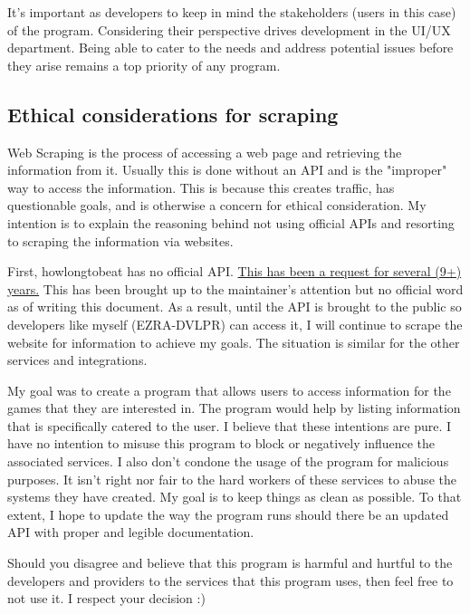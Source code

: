 It's important as developers to keep in mind the stakeholders (users
in this case) of the program. Considering their perspective drives
development in the UI/UX department. Being able to cater to the needs
and address potential issues before they arise remains a top priority
of any program.

\subsection{Ethical considerations for scraping}

Web Scraping is the process of accessing a web page and retrieving
the information from it. Usually this is done without an API and is
the "improper" way to access the information. This is because this
creates traffic, has questionable goals, and is otherwise a concern
for ethical consideration. My intention is to explain the reasoning
behind not using official APIs and resorting to scraping the
information via websites.

First, howlongtobeat has no official API.
\href{https://howlongtobeat.com/forum/thread/807/1}{This has been a
request for several (9+) years.} This has been brought up to the
maintainer's attention but no official word as of writing this
document. As a result, until the API is brought to the public so
developers like myself (EZRA-DVLPR) can access it, I will continue to scrape
the website for information to achieve my goals.
The situation is similar for the other services and integrations.

My goal was to create a program that allows users to access
information for the games that they are interested in. The program
would help by listing information that is specifically catered to the user.
I believe that these intentions are pure. I have no intention to
misuse this program to block or negatively influence the associated
services. I also don't condone the usage of the program for malicious
purposes. It isn't right nor fair to the hard workers of these
services to abuse the systems they have created. My goal is to keep
things as clean as possible. To that extent, I hope to update the way
the program runs should there be an updated API with proper and
legible documentation.

Should you disagree and believe that this program is harmful and
hurtful to the developers and providers to the services that this
program uses, then feel free to not use it. I respect your decision :)
